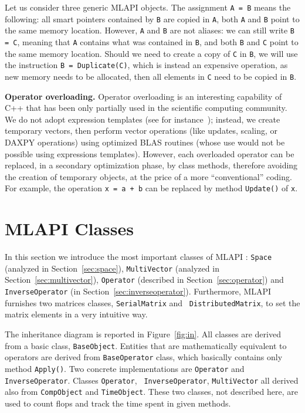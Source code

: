\documentclass{article}[11pt]
\newcommand{\MLAPI}  {{\sc MLAPI }}
\begin{document}
\noindent
Let us consider three generic \MLAPI objects.
The assignment \verb!A = B! means the following: all smart pointers contained
by \verb!B! are copied in \verb!A!, both \verb!A! and \verb!B! point to the
same memory location. However, \verb!A! and \verb!B! are not aliases: we can
still write \verb!B = C!, meaning that \verb!A! contains what was contained in
\verb!B!, and both \verb!B! and \verb!C! point to the same memory location. 
Should we need to create a copy of \verb!C! in \verb!B!, we will use the
instruction \verb!B = Duplicate(C)!, which is instead an expensive operation, as new memory
needs to be allocated, then all elements in \verb!C! need to be copied in
\verb!B!.

\medskip

\noindent
{\bf Operator overloading.} Operator overloading is an 
interesting capability of C++ that has been only
partially used in the scientific computing community. We do not adopt expression
templates (see for instance~\cite{vandevoorde03cpp}); instead, we
create temporary vectors, then perform vector operations (like updates,
scaling, or DAXPY operations) using optimized BLAS routines 
(whose use would not be possible using expressions templates). 
However, each overloaded operator can be replaced, in a secondary
optimization phase, by class methods, therefore
avoiding the creation of temporary objects, at the price of a more
``conventional'' coding. For example, the operation {\tt x = a + b} can be
replaced by method {\tt Update()} of {\tt x}.

\section{\MLAPI Classes}
\label{sec:basic}

In this section we introduce the
most important classes of \MLAPI: {\tt Space} 
(analyzed in Section~\ref{sec:space}), {\tt MultiVector}
(analyzed in Section~\ref{sec:multivector}),
{\tt Operator} (described in Section~\ref{sec:operator}) and 
{\tt InverseOperator} (in Section~\ref{sec:inverseoperator}). Furthermore,
\MLAPI furnishes two matrices classes, {\tt SerialMatrix} and 
{\tt
  DistributedMatrix}, to set the matrix elements in a very intuitive 
  way.

The inheritance diagram is reported in Figure~\ref{fig:in}. All classes are
derived from a basic class, {\tt BaseObject}. Entities that are mathematically
equivalent to operators are derived from {\tt BaseOperator} class, which
basically contains only method {\tt Apply()}. Two concrete implementations are
{\tt Operator} and {\tt InverseOperator}.  Classes {\tt Operator}, {\tt
  InverseOperator}, {\tt MultiVector} all derived also from {\tt CompObject}
  and {\tt TimeObject}. These two classes, not  described here, are used to
  count flops and track the time spent in given methods. 
\end{document}

